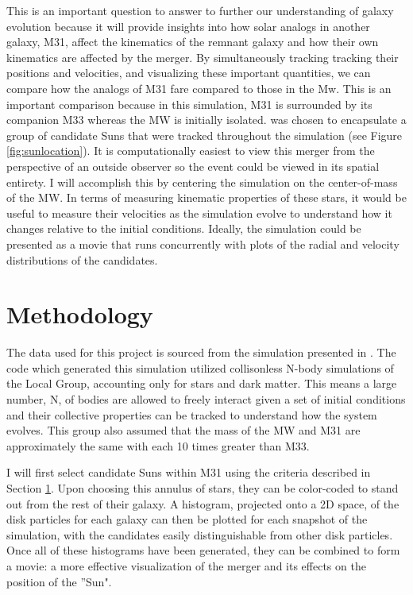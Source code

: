 \documentclass{aastex63}
\begin{document}
This is an important question to answer to further our understanding of galaxy evolution because it will provide insights into how solar analogs in another galaxy, M31, affect the kinematics of the remnant galaxy and how their own kinematics are affected by the merger. By simultaneously tracking tracking their positions and velocities, and visualizing these important quantities, we can compare how the analogs of M31 fare compared to those in the Mw. This is an important comparison because in this simulation, M31 is surrounded by its companion M33 whereas the MW is initially isolated.  was chosen to encapsulate a group of candidate Suns that were tracked throughout the simulation (see Figure \ref{fig:sunlocation}). It is computationally easiest to view this merger from the perspective of an outside observer so the event could be viewed in its spatial entirety. I will accomplish this by centering the simulation on the center-of-mass of the MW. In terms of measuring kinematic properties of these stars, it would be useful to measure their velocities as the simulation evolve to understand how it changes relative to the initial conditions. Ideally, the simulation could be presented as a movie that runs concurrently with plots of the radial and velocity distributions of the candidates.

\section{Methodology} \label{sec:proposal}
The data used for this project is sourced from the simulation presented in \cite{2012ApJ...753....9V}. The code which generated this simulation utilized collisonless N-body simulations of the Local Group, accounting only for stars and dark matter. This means a large number, N, of bodies are allowed to freely interact given a set of initial conditions and their collective properties can be tracked to understand how the system evolves. This group also assumed that the mass of the MW and M31 are approximately the same with each 10 times greater than M33.

I will first select candidate Suns within M31 using the criteria described in Section \ref{sec:proposal}. Upon choosing this annulus of stars, they can be color-coded to stand out from the rest of their galaxy. A histogram, projected onto a 2D space, of the disk particles for each galaxy can then be plotted for each snapshot of the simulation, with the candidates easily distinguishable from other disk particles. Once all of these histograms have been generated, they can be combined to form a movie: a more effective visualization of the merger and its effects on the position of the ''Sun".
\end{document}

